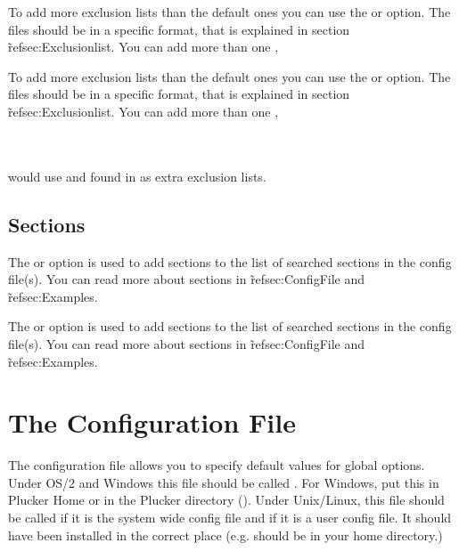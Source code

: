 \begin{latexonly}
To add more exclusion lists than the default ones you can use the
 or 
option. The  files should be in a specific
format, that is explained in section \~ref{sec:Exclusionlist}. You
can add more than one ,
\end{latexonly}
\begin{htmlonly}
To add more exclusion lists than the default ones you can use the
 or 
option. The  files should be in a specific
format, that is explained in section \~ref{sec:Exclusionlist}. You
can add more than one ,
\end{htmlonly}\\

\\

would use  and  found in
 as extra exclusion lists.


\subsection{Sections}

\begin{latexonly}
The  or 
option is used to add sections to the list of searched sections in the
config file(s). You can read more about sections in \~ref{sec:ConfigFile}
and \~ref{sec:Examples}.
\end{latexonly}
\begin{htmlonly}
The  or 
option is used to add sections to the list of searched sections in the
config file(s). You can read more about sections in \~ref{sec:ConfigFile}
and \~ref{sec:Examples}.
\end{htmlonly}


\section{The Configuration File}\label{sec:ConfigFile}

The configuration file allows you to specify default values for global
options. Under OS/2 and Windows this file should be called .
For Windows, put this in Plucker Home or in the Plucker directory
(). Under Unix/Linux, this file should be called
 if it is the system wide config file and 
if it is a user config file. It should have been installed in the correct
place (e.g.  should be in your home directory.)\\


